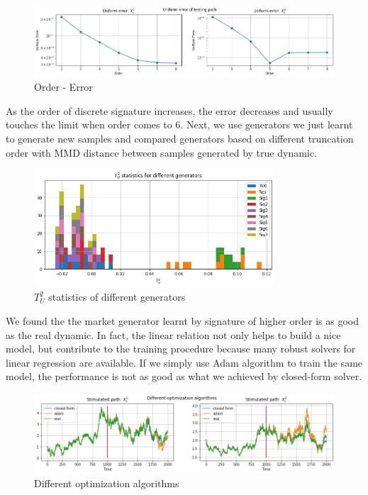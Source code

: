 \documentclass[12pt]{report}
\theoremstyle{definition}
\theoremstyle{remark}
\begin{document}
 \begin{figure}[H]
    \centering
    \includegraphics[width=\textwidth]{figs/res4.png}
    \caption{ Order - Error}
\end{figure}
As the order of discrete signature increases, the error decreases and usually touches the limit when order comes to 6. Next, we use generators we just learnt to generate new samples and compared generators based on different truncation order with MMD distance between samples generated by true dynamic. 
\begin{figure}[H]
  \centering
  \includegraphics[width=0.8\textwidth]{figs/res5.png}
  \caption{$T_{U}^{2}$ statistics of different generators}
\end{figure}
We found the the market generator learnt by signature of higher order is as good as the real dynamic. In fact, the linear relation not only helps to build a nice model, but contribute to the training procedure because many robust solvers for linear regression are available. If we simply use Adam algorithm to train the same model, the performance is not as good as what we achieved by closed-form solver. 
\begin{figure}[H]
  \centering
  \includegraphics[width=\textwidth]{figs/res6.png}
  \caption{Different optimization algorithms}
\end{figure}
\end{document}

